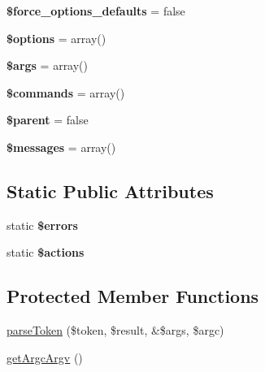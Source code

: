 \begin{DoxyCompactItemize}
\item 
\hypertarget{class_p_e_a_r2_1_1_console_1_1_command_line_a42ca661e21127fe7272d2293c9bc26bd}{
{\bfseries \$force\-\_\-options\-\_\-defaults} = false}
\label{class_p_e_a_r2_1_1_console_1_1_command_line_a42ca661e21127fe7272d2293c9bc26bd}

\item 
\hypertarget{class_p_e_a_r2_1_1_console_1_1_command_line_a011800c63ece4cbbfa77136a20607023}{
{\bfseries \$options} = array()}
\label{class_p_e_a_r2_1_1_console_1_1_command_line_a011800c63ece4cbbfa77136a20607023}

\item 
\hypertarget{class_p_e_a_r2_1_1_console_1_1_command_line_a67e94494731d99ed23b123e95175bc10}{
{\bfseries \$args} = array()}
\label{class_p_e_a_r2_1_1_console_1_1_command_line_a67e94494731d99ed23b123e95175bc10}

\item 
\hypertarget{class_p_e_a_r2_1_1_console_1_1_command_line_ab63cd62b3b65fd223b6f3d57b6ca754d}{
{\bfseries \$commands} = array()}
\label{class_p_e_a_r2_1_1_console_1_1_command_line_ab63cd62b3b65fd223b6f3d57b6ca754d}

\item 
\hypertarget{class_p_e_a_r2_1_1_console_1_1_command_line_a4e2313a4b35b72a06ac45fd38960f677}{
{\bfseries \$parent} = false}
\label{class_p_e_a_r2_1_1_console_1_1_command_line_a4e2313a4b35b72a06ac45fd38960f677}

\item 
\hypertarget{class_p_e_a_r2_1_1_console_1_1_command_line_a21a183f927a6d243fe6b4ba3a6c4d4c8}{
{\bfseries \$messages} = array()}
\label{class_p_e_a_r2_1_1_console_1_1_command_line_a21a183f927a6d243fe6b4ba3a6c4d4c8}

\end{DoxyCompactItemize}
\subsection*{\-Static \-Public \-Attributes}
\begin{DoxyCompactItemize}
\item 
static {\bfseries \$errors}
\item 
static {\bfseries \$actions}
\end{DoxyCompactItemize}
\subsection*{\-Protected \-Member \-Functions}
\begin{DoxyCompactItemize}
\item 
\hyperlink{class_p_e_a_r2_1_1_console_1_1_command_line_a66195e82a85ca7b74d6c70a819d47e45}{parse\-Token} (\$token, \$result, \&\$args, \$argc)
\item 
\hyperlink{class_p_e_a_r2_1_1_console_1_1_command_line_ada6370e0887de631603cfb81f6243092}{get\-Argc\-Argv} ()
\end{DoxyCompactItemize}


